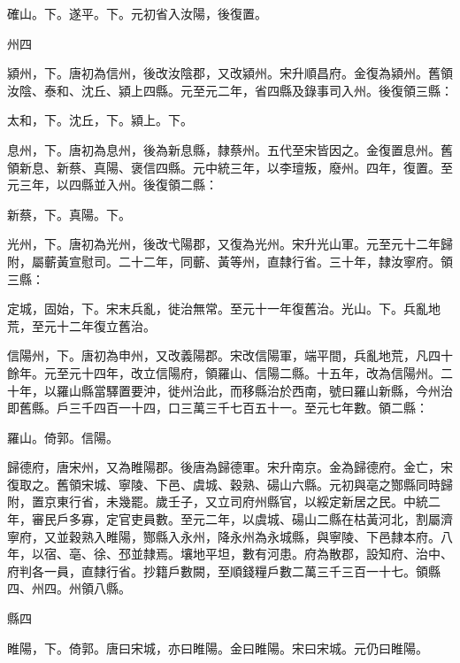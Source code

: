 \begin{pinyinscope}
 確山。下。遂平。下。元初省入汝陽，後復置。



 州四



 潁州，下。唐初為信州，後改汝陰郡，又改潁州。宋升順昌府。金復為潁州。舊領汝陰、泰和、沈丘、潁上四縣。元至元二年，省四縣及錄事司入州。後復領三縣：



 太和，下。沈丘，下。潁上。下。



 息州，下。唐初為息州，後為新息縣，隸蔡州。五代至宋皆因之。金復置息州。舊領新息、新蔡、真陽、褒信四縣。元中統三年，以李璮叛，廢州。四年，復置。至元三年，以四縣並入州。後復領二縣：



 新蔡，下。真陽。下。



 光州，下。唐初為光州，後改弋陽郡，又復為光州。宋升光山軍。元至元十二年歸附，屬蘄黃宣慰司。二十二年，同蘄、黃等州，直隸行省。三十年，隸汝寧府。領三縣：



 定城，固始，下。宋末兵亂，徙治無常。至元十一年復舊治。光山。下。兵亂地荒，至元十二年復立舊治。



 信陽州，下。唐初為申州，又改義陽郡。宋改信陽軍，端平間，兵亂地荒，凡四十餘年。元至元十四年，改立信陽府，領羅山、信陽二縣。十五年，改為信陽州。二十年，以羅山縣當驛置要沖，徙州治此，而移縣治於西南，號曰羅山新縣，今州治即舊縣。戶三千四百一十四，口三萬三千七百五十一。至元七年數。領二縣：



 羅山。倚郭。信陽。



 歸德府，唐宋州，又為睢陽郡。後唐為歸德軍。宋升南京。金為歸德府。金亡，宋復取之。舊領宋城、寧陵、下邑、虞城、穀熟、碭山六縣。元初與亳之酂縣同時歸附，置京東行省，未幾罷。歲壬子，又立司府州縣官，以綏定新居之民。中統二年，審民戶多寡，定官吏員數。至元二年，以虞城、碭山二縣在枯黃河北，割屬濟寧府，又並穀熟入睢陽，酂縣入永州，降永州為永城縣，與寧陵、下邑隸本府。八年，以宿、亳、徐、邳並隸焉。壤地平坦，數有河患。府為散郡，設知府、治中、府判各一員，直隸行省。抄籍戶數闕，至順錢糧戶數二萬三千三百一十七。領縣四、州四。州領八縣。



 縣四



 睢陽，下。倚郭。唐曰宋城，亦曰睢陽。金曰睢陽。宋曰宋城。元仍曰睢陽。




\end{pinyinscope}
